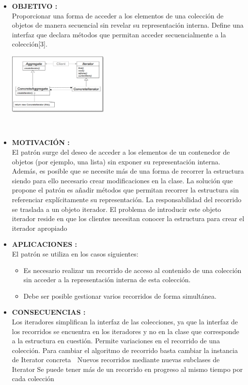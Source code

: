 \documentclass[twoside,twocolumn]{article}
\begin{document}
	\begin{itemize}
		\item \textbf{OBJETIVO :}	\\Proporcionar una forma de acceder a los elementos de una colección de objetos de manera secuencial sin revelar su representación interna. 
        Define una interfaz que declara métodos que permitan acceder secuencialmente a la colección[3].
         
        \begin{center}
            \includegraphics[width=5cm]{./img/Imagen9.png} 
        \end{center}
        \\
		\item \textbf{MOTIVACIÓN  :}\\ El patrón surge del deseo de acceder a los elementos de un contenedor de objetos (por ejemplo, una lista) sin exponer su representación interna. Además, es posible que se necesite más de una forma de recorrer la estructura siendo para ello necesario crear modificaciones en la clase. 
        La solución que propone el patrón es añadir métodos que permitan recorrer la estructura sin referenciar explícitamente su representación. La responsabilidad del recorrido se traslada a un objeto iterador.  
        El problema de introducir este objeto iterador reside en que los clientes necesitan conocer la estructura para crear el iterador apropiado
         

		\item \textbf{APLICACIONES  :}\\ El patrón se utiliza en los casos siguientes:  
            \begin{itemize}
            \item Es necesario realizar un recorrido de acceso al contenido de una colección sin acceder a la representación interna de esta colección. 
            \item Debe ser posible gestionar varios recorridos de forma simultánea.
            \end{itemize}   
        
            
		\item \textbf{CONSECUENCIAS  :}\\	Los iteradores simplifican la interfaz de las colecciones, ya que la interfaz de los recorridos se encuentra en los iteradores y no en la clase que corresponde a la estructura en cuestión. 
        Permite variaciones en el recorrido de una colección. 
        Para cambiar el algoritmo de recorrido basta cambiar la instancia de Iterator concreta  Nuevos recorridos mediante nuevas subclases de Iterator  
        Se puede tener más de un recorrido en progreso al mismo tiempo por cada colección
        
        
	\end{itemize}
	
\end{document}
